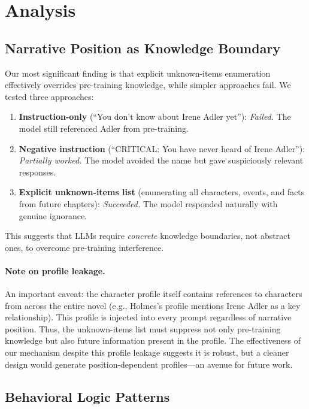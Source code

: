 \documentclass[11pt,a4paper]{article}
\begin{document}
\section{Analysis}
\label{sec:analysis}

\subsection{Narrative Position as Knowledge Boundary}
\label{sec:knowledge-boundary}

Our most significant finding is that explicit unknown-items enumeration effectively overrides pre-training knowledge, while simpler approaches fail.
We tested three approaches:

\begin{enumerate}
\setlength\itemsep{0pt}
\item \textbf{Instruction-only} (``You don't know about Irene Adler yet''): \textit{Failed.} The model still referenced Adler from pre-training.
\item \textbf{Negative instruction} (``CRITICAL: You have never heard of Irene Adler''): \textit{Partially worked.} The model avoided the name but gave suspiciously relevant responses.
\item \textbf{Explicit unknown-items list} (enumerating all characters, events, and facts from future chapters): \textit{Succeeded.} The model responded naturally with genuine ignorance.
\end{enumerate}

This suggests that LLMs require \textit{concrete} knowledge boundaries, not abstract ones, to overcome pre-training interference.

\paragraph{Note on profile leakage.}
An important caveat: the character profile itself contains references to characters from across the entire novel (e.g., Holmes's profile mentions Irene Adler as a key relationship).
This profile is injected into every prompt regardless of narrative position.
Thus, the unknown-items list must suppress not only pre-training knowledge but also future information present in the profile.
The effectiveness of our mechanism despite this profile leakage suggests it is robust, but a cleaner design would generate position-dependent profiles---an avenue for future work.

\subsection{Behavioral Logic Patterns}
\label{sec:logic-patterns}
\end{document}
